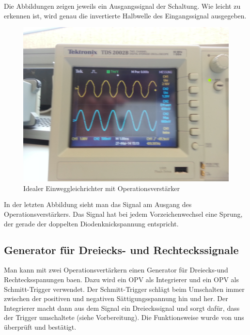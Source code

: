 \documentclass[a4paper,titlepage]{scrartcl}
\numberwithin{equation}{section}
\begin{document}
Die Abbildungen zeigen jeweils ein Ausgangssignal der Schaltung. Wie leicht zu erkennen ist, wird genau die invertierte Halbwelle des Eingangssignal ausgegeben. 

\begin{figure}[H]
\centering
\includegraphics[scale=.08]{bilder/aufgabe_4_1_3.jpg} 
\caption{Idealer Einweggleichrichter mit Operationsverstärker}
\end{figure}

In der letzten Abbildung sieht man das Signal am Ausgang des Operationsverstärkers. Das Signal hat bei jedem Vorzeichenwechsel eine Sprung, der gerade der doppelten Diodenknickspannung entspricht.

\subsection{Generator für Dreiecks- und Rechteckssignale}

Man kann mit zwei Operationsvertärkern einen Generator für Dreiecks-und Rechtecksspanungen baen. Dazu wird ein OPV als Integrierer und ein OPV als Schmitt-Trigger verwendet. Der Schmitt-Trigger schlägt beim Umschalten immer zwischen der positiven und negativen Sättigungsspannung hin und her. Der Integrierer macht dann aus dem Signal ein Dreieckssignal und sorgt dafür, dass der Trigger umschaltete (siehe Vorbereitung). Die Funktionsweise wurde von uns überprüft und bestätigt.
\end{document}
